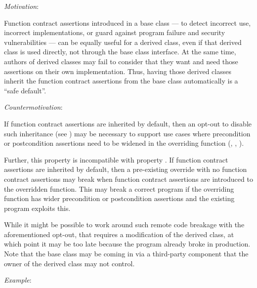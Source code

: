 \emph{Motivation}:

Function contract assertions introduced in a base class --- to detect incorrect use, incorrect implementations, or guard against program failure and security vulnerabilities --- can be equally useful for a derived class, even if that derived class is used directly, not through the base class interface.  At the same time, authors of derived classes may fail to consider that they want and need those assertions on their own implementation. Thus, having those derived classes inherit the function contract assertions from the base class automatically is a ``safe default''.

\emph{Countermotivation}:

If function contract assertions are inherited by default, then an opt-out to disable such inheritance (see ) may be necessary to support use cases where precondition or postcondition assertions need to be widened in the overriding function (, , ). 

Further, this property is incompatible with property . If function contract assertions are inherited by default, then a pre-existing override with no function contract assertions may break when function contract assertions are introduced to the overridden function. This may break a correct program if the overriding function has wider precondition or postcondition assertions and the existing program exploits this.

While it might be possible to work around such remote code breakage with the aforementioned opt-out, that requires a modification of the derived class, at which point it may be too late because the program already broke in production. Note that the base class may be coming in via a third-party component that the owner of the derived class may not control.

\emph{Example}:

